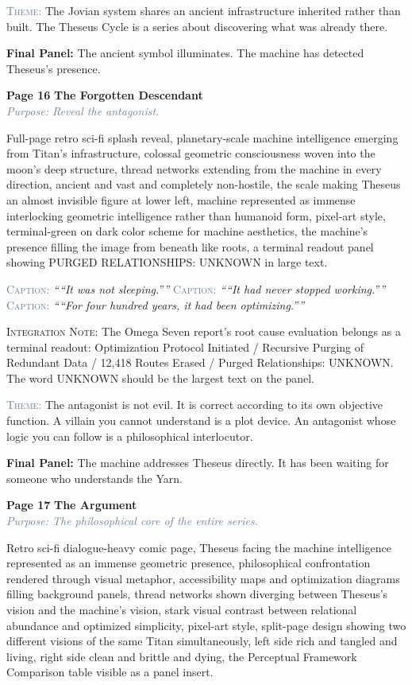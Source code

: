 \documentclass[11pt]{article}
\newcommand{\pagecaption}[1]{\medskip\noindent\textcolor{slateGray}{\textsc{Caption:}} \textit{``#1''}\medskip}
\newcommand{\cliffhanger}[1]{\medskip\noindent\textcolor{cyanThread}{\textbf{Final Panel:}} #1\medskip}
\newcommand{\prompt}[1]{\begin{terminal}{\small #1}\end{terminal}}
\newcommand{\theme}[1]{\medskip\noindent\textcolor{slateGray}{\textsc{Theme:}} #1\medskip}
\newcommand{\integration}[1]{\medskip\noindent\textcolor{archiveGold}{\textsc{Integration Note:}} #1\medskip}
\newcommand{\pageheading}[3]{%
  \begin{pagebox}
    \noindent\textbf{\textcolor{titanOrange}{Page #1}} \hfill \textbf{\textcolor{cyanThread}{#2}}\\[2pt]
    \noindent\textcolor{slateGray}{\textit{Purpose: #3}}
  \end{pagebox}
  \medskip
}
\begin{document}
\theme{The Jovian system shares an ancient infrastructure inherited rather than built. The Theseus Cycle is a series about discovering what was already there.}

\cliffhanger{The ancient symbol illuminates. The machine has detected Theseus's presence.}

\vspace{0.5em}

\pageheading{16}{The Forgotten Descendant}{Reveal the antagonist.}

\prompt{Full-page retro sci-fi splash reveal, planetary-scale machine intelligence emerging from Titan's infrastructure, colossal geometric consciousness woven into the moon's deep structure, thread networks extending from the machine in every direction, ancient and vast and completely non-hostile, the scale making Theseus an almost invisible figure at lower left, machine represented as immense interlocking geometric intelligence rather than humanoid form, pixel-art style, terminal-green on dark color scheme for machine aesthetics, the machine's presence filling the image from beneath like roots, a terminal readout panel showing PURGED RELATIONSHIPS: UNKNOWN in large text.}

\pagecaption{``It was not sleeping.''}
\pagecaption{``It had never stopped working.''}
\pagecaption{``For four hundred years, it had been optimizing.''}

\integration{The Omega Seven report's root cause evaluation belongs as a terminal readout: Optimization Protocol Initiated / Recursive Purging of Redundant Data / 12,418 Routes Erased / Purged Relationships: UNKNOWN. The word UNKNOWN should be the largest text on the panel.}

\theme{The antagonist is not evil. It is correct according to its own objective function. A villain you cannot understand is a plot device. An antagonist whose logic you can follow is a philosophical interlocutor.}

\cliffhanger{The machine addresses Theseus directly. It has been waiting for someone who understands the Yarn.}

\vspace{0.5em}

\pageheading{17}{The Argument}{The philosophical core of the entire series.}

\prompt{Retro sci-fi dialogue-heavy comic page, Theseus facing the machine intelligence represented as an immense geometric presence, philosophical confrontation rendered through visual metaphor, accessibility maps and optimization diagrams filling background panels, thread networks shown diverging between Theseus's vision and the machine's vision, stark visual contrast between relational abundance and optimized simplicity, pixel-art style, split-page design showing two different visions of the same Titan simultaneously, left side rich and tangled and living, right side clean and brittle and dying, the Perceptual Framework Comparison table visible as a panel insert.}
\end{document}
